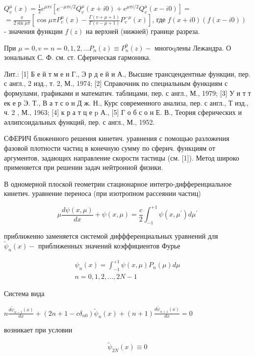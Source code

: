 \documentclass[10pt]{article}
\begin{document}
$Q_{v}^{\mu}(x)=\frac{1}{2} e^{\mu \pi i}\left[e^{-\mu \pi i / 2} Q_{v}^{\mu}(x+i 0)+e^{\mu \pi i / 2} Q_{v}^{\mu}(x-i 0)\right]=$ $=\frac{\pi}{2 \sin \mu \pi}\left[\cos \mu \pi P_{v}^{\mu}(x)-\frac{\Gamma(v+\mu+1)}{\Gamma(v-\mu+1)} P_{v}^{-\mu}(x)\right]$, где $f(x+i 0)(f(x-i 0))$ - значения функции $f(z)$ на верхней (нижней) границе разреза.



При $\mu=0, v=n=0,1,2, \ldots P_{n}(z) \equiv P_{n}^{0}(z)-$ многоqлены Лежандра. О зональных С. Ф. см. ст. Сферическая гармоника.



Лит.: [1] Б е й т м е н Г., Э р д е й и А., Высшие трансцендентные функции, пер. с англ., 2 изд., т. 2, М., 1974; [2] Справочник по специальным функциям с формулами, графиками и математич. таблицами, пер. с англ., М., 1979; [3] У и т т ек е р Э. Т., В а т с о н Д ж. Н., Курс современного анализа, пер. с англ., Т изд., ч. 2 , М., 1963; [4] к р а т ц е p А., [5] Г о б с о н Е. В., Теория сферических и әллипсоидальных функций, пер. с англ., М., 1952.



СФЕРИЧ ближенного решения кинетич. уравнения с помощью разложения фазовой плотности частиц в конечную сумму по сферич. функциям от аргументов, задающих направление скорости тастицы (см. [1]). Метод широко применяется при решении задач нейтронной физики.



В одномерной плоской геометрии стационарное интегро-дифференциальное кинетич. уравнение переноса (при изотропном рассеянии частиц)



\[

\mu \frac{d \psi(x, \mu)}{d x}+\psi(x, \mu)=\frac{c}{2} \int_{-1}^{+1} \psi\left(x, \mu^{\prime}\right) d \mu^{\prime}

\]



приближенно заменяется системой диффференциальных уравнений для $\tilde{\psi}_{n}(x)-$ приближенных значений коэффициентов Фурье



\[

\begin{gathered}

\psi_{n}(x)=\int_{-1}^{+1} \psi(x, \mu) P_{n}(\mu) d \mu \\

n=0,1,2, \ldots, 2 N-1

\end{gathered}

\]



Система вида



$n \frac{d \tilde{\psi}_{n-1}(x)}{d x}+\left(2 n+1-c \delta_{n 0}\right) \tilde{\psi}_{n}(x)+(n+1) \frac{d \tilde{\psi}_{n+1}(x)}{d x}=0$



возникает при условии



\[

\tilde{\psi}_{2 N}(x) \equiv 0

\]
\end{document}
